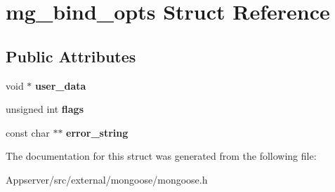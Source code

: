 \hypertarget{structmg__bind__opts}{}\section{mg\+\_\+bind\+\_\+opts Struct Reference}
\label{structmg__bind__opts}
\subsection*{Public Attributes}
\begin{DoxyCompactItemize}
\item 
void $\ast$ {\bfseries user\+\_\+data}\hypertarget{structmg__bind__opts_a3bd493ef5bd6c8da605b1480a6c189c4}{}\label{structmg__bind__opts_a3bd493ef5bd6c8da605b1480a6c189c4}

\item 
unsigned int {\bfseries flags}\hypertarget{structmg__bind__opts_ae257fe726a23692a36fb8c92885d4873}{}\label{structmg__bind__opts_ae257fe726a23692a36fb8c92885d4873}

\item 
const char $\ast$$\ast$ {\bfseries error\+\_\+string}\hypertarget{structmg__bind__opts_a9320251e7b1a273fedc123a3739fb9fa}{}\label{structmg__bind__opts_a9320251e7b1a273fedc123a3739fb9fa}

\end{DoxyCompactItemize}


The documentation for this struct was generated from the following file\+:\begin{DoxyCompactItemize}
\item 
Appserver/src/external/mongoose/mongoose.\+h\end{DoxyCompactItemize}
